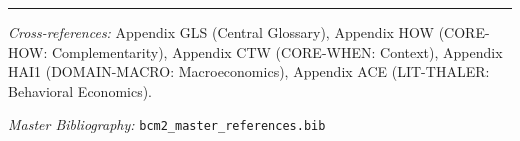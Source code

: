 \vspace{1em}
\hrule
\vspace{0.5em}

\noindent\textit{Cross-references:}
Appendix GLS (Central Glossary),
Appendix HOW (CORE-HOW: Complementarity),
Appendix CTW (CORE-WHEN: Context),
Appendix HAI1 (DOMAIN-MACRO: Macroeconomics),
Appendix ACE (LIT-THALER: Behavioral Economics).

\noindent\textit{Master Bibliography:} \texttt{bcm2\_master\_references.bib}


